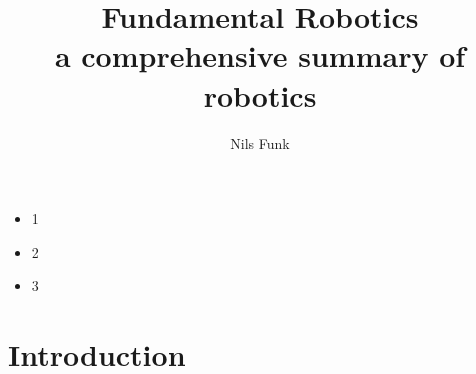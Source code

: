\documentclass[11pt]{article}
\title{Fundamental Robotics \\ a comprehensive summary of robotics}
\author{Nils Funk}
\date{}
\begin{document}
\maketitle

\tableofcontents


\begin{itemize}
 \item 1
 \item 2
 \item 3
\end{itemize}

\section{Introduction}

















 
\end{document}
